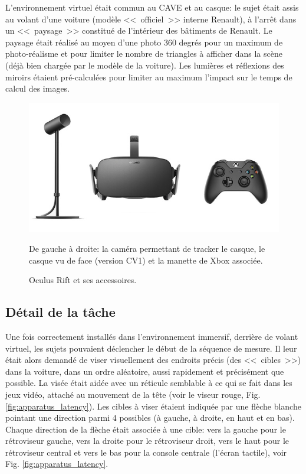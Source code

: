 	\par L'environnement virtuel était commun au CAVE et au casque: le sujet était assis au volant d'une voiture (modèle <<~officiel~>> interne Renault), à l'arrêt dans un <<~paysage~>> constitué de l'intérieur des bâtiments de Renault. Le paysage était réalisé au moyen d'une photo 360 degrés pour un maximum de photo-réalisme et pour limiter le nombre de triangles à afficher dans la scène (déjà bien chargée par le modèle de la voiture). Les lumières et réflexions des miroirs étaient pré-calculées pour limiter au maximum l'impact sur le temps de calcul des images.
	
	\begin{figure}
		\centering
		\includegraphics[scale=.65]{Figures/OculusRift}
		\caption{Oculus Rift et ses accessoires.}{De gauche à droite: la caméra permettant de tracker le casque, le casque vu de face (version CV1) et la manette de Xbox associée.}
		\label{fig:oculus_rift}
	\end{figure}
	
	\subsection{Détail de la tâche}	
	\par Une fois correctement installés dans l'environnement immersif, derrière de volant virtuel, les sujets pouvaient déclencher le début de la séquence de mesure. Il leur était alors demandé de viser visuellement des endroits précis (des <<~cibles~>>) dans la voiture, dans un ordre aléatoire, aussi rapidement et précisément que possible. La visée était aidée avec un réticule semblable à ce qui se fait dans les jeux vidéo, attaché au mouvement de la tête (voir le viseur rouge, Fig. \ref{fig:apparatus_latency}). Les cibles à viser étaient indiquée par une flèche blanche pointant une direction parmi 4 possibles (à gauche, à droite, en haut et en bas). Chaque direction de la flèche était associée à une cible: vers la gauche pour le rétroviseur gauche, vers la droite pour le rétroviseur droit, vers le haut pour le rétroviseur central et vers le bas pour la console centrale (l'écran tactile), voir Fig. \ref{fig:apparatus_latency}.
	
